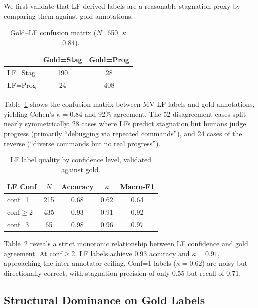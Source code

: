 \documentclass[11pt,a4paper]{article}
\begin{document}
We first validate that LF-derived labels are a reasonable stagnation proxy by comparing them against gold annotations.

\begin{table}[t]
\centering
\small
\begin{tabular}{lcc}
\toprule
 & Gold=Stag & Gold=Prog \\
\midrule
LF=Stag & 190 & 28 \\
LF=Prog & 24 & 408 \\
\bottomrule
\end{tabular}
\caption{Gold--LF confusion matrix ($N$=650, $\kappa$=0.84).}
\label{tab:gold-lf-confusion}
\end{table}

Table~\ref{tab:gold-lf-confusion} shows the confusion matrix between MV LF labels and gold annotations, yielding Cohen's $\kappa = 0.84$ and 92\% agreement.
The 52 disagreement cases split nearly symmetrically: 28 cases where LFs predict stagnation but humans judge progress (primarily ``debugging via repeated commands''), and 24 cases of the reverse (``diverse commands but no real progress'').

\begin{table}[t]
\centering
\small
\begin{tabular}{lcccc}
\toprule
LF Conf & $N$ & Accuracy & $\kappa$ & Macro-F1 \\
\midrule
conf=1 & 215 & 0.68 & 0.62 & 0.64 \\
conf$\geq$2 & 435 & 0.93 & 0.91 & 0.92 \\
conf=3 & 65 & 0.98 & 0.96 & 0.97 \\
\bottomrule
\end{tabular}
\caption{LF label quality by confidence level, validated against gold.}
\label{tab:lf-conf-quality}
\end{table}

Table~\ref{tab:lf-conf-quality} reveals a strict monotonic relationship between LF confidence and gold agreement.
At conf$\geq$2, LF labels achieve 0.93 accuracy and $\kappa = 0.91$, approaching the inter-annotator ceiling.
Conf=1 labels ($\kappa = 0.62$) are noisy but directionally correct, with stagnation precision of only 0.55 but recall of 0.71.

\subsection{Structural Dominance on Gold Labels}
\label{sec:structural-gold}
\end{document}
